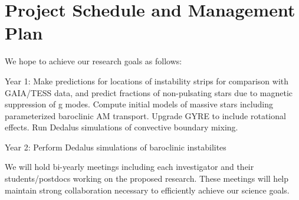 \section{Project Schedule and Management Plan}

We hope to achieve our research goals as follows:

Year 1: Make predictions for locations of instability strips for comparison with GAIA/TESS data, and predict fractions of non-pulsating stars due to magnetic suppression of g modes. Compute initial models of massive stars including parameterized baroclinic AM transport. Upgrade GYRE to include rotational effects. Run Dedalus simulations of convective boundary mixing.

Year 2: Perform Dedalus simulations of baroclinic instabilites

We will  hold bi-yearly meetings including each investigator and their students/postdocs working on the proposed research. These meetings will help maintain strong collaboration necessary to efficiently achieve our science goals.
